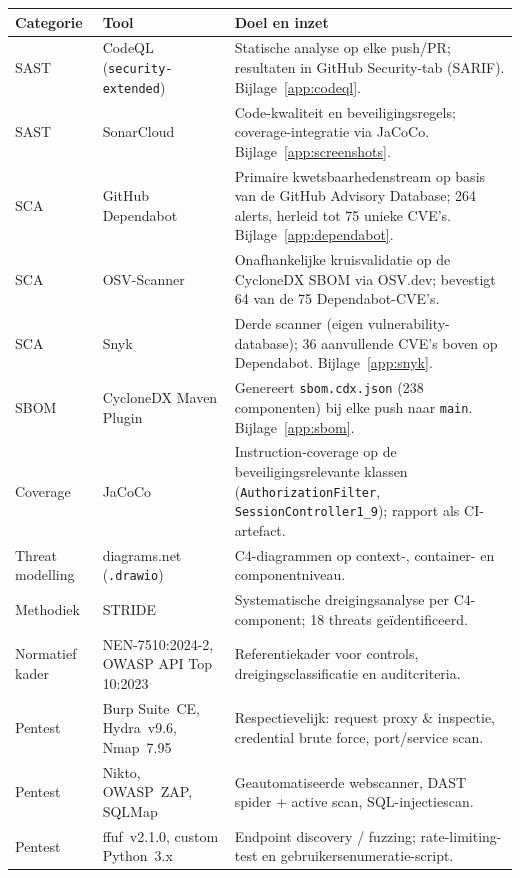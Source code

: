 \documentclass[12pt, a4paper]{report}
\begin{document}
{\small
\begin{tabularx}{\textwidth}{@{}p{2.2cm}p{4.6cm}X@{}}
    \toprule
    \textbf{Categorie} & \textbf{Tool} & \textbf{Doel en inzet} \\
    \midrule
    SAST & CodeQL (\texttt{security-extended}) &
        Statische analyse op elke push/PR; resultaten in GitHub Security-tab
        (SARIF). Bijlage~\ref{app:codeql}. \\
    SAST & SonarCloud &
        Code-kwaliteit en beveiligingsregels; coverage-integratie via JaCoCo.
        Bijlage~\ref{app:screenshots}. \\
    SCA & GitHub Dependabot &
        Primaire kwetsbaarhedenstream op basis van de GitHub Advisory Database;
        264 alerts, herleid tot 75 unieke CVE's. Bijlage~\ref{app:dependabot}. \\
    SCA & OSV-Scanner &
        Onafhankelijke kruisvalidatie op de CycloneDX SBOM via OSV.dev;
        bevestigt 64 van de 75 Dependabot-CVE's. \\
    SCA & Snyk &
        Derde scanner (eigen vulnerability-database); 36 aanvullende CVE's
        boven op Dependabot. Bijlage~\ref{app:snyk}. \\
    SBOM & CycloneDX Maven Plugin &
        Genereert \texttt{sbom.cdx.json} (238 componenten) bij elke push naar
        \texttt{main}. Bijlage~\ref{app:sbom}. \\
    Coverage & JaCoCo &
        Instruction-coverage op de beveiligingsrelevante klassen
        (\texttt{AuthorizationFilter}, \texttt{SessionController1\_9});
        rapport als CI-artefact. \\
    Threat modelling & diagrams.net (\texttt{.drawio}) &
        C4-diagrammen op context-, container- en componentniveau. \\
    Methodiek & STRIDE &
        Systematische dreigingsanalyse per C4-component; 18 threats
        geïdentificeerd. \\
    Normatief kader & NEN-7510:2024-2, OWASP API Top 10:2023 &
        Referentiekader voor controls, dreigingsclassificatie en
        auditcriteria. \\
    \midrule
    Pentest & Burp Suite~CE, Hydra~v9.6, Nmap~7.95 &
        Respectievelijk: request proxy \& inspectie, credential brute
        force, port/service scan. \\
    Pentest & Nikto, OWASP~ZAP, SQLMap &
        Geautomatiseerde webscanner, DAST spider + active scan,
        SQL-injectiescan. \\
    Pentest & ffuf~v2.1.0, custom Python~3.x &
        Endpoint discovery / fuzzing; rate-limiting-test en
        gebruikersenumeratie-script. \\
    \bottomrule
\end{tabularx}
}%
\end{document}
